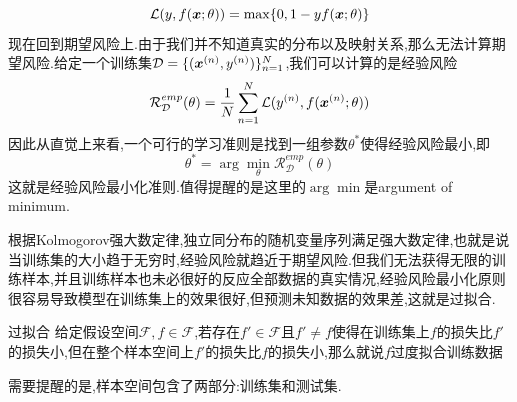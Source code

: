 $$
\mathcal{L}(y,f(\bm{x};\theta))=\max\{0,1-yf(\bm{x};\theta)\}
$$
\qquad 现在回到期望风险上.由于我们并不知道真实的分布以及映射关系,那么无法计算期望风险.给定一个训练集$\mathcal{D}=\{(\bm{x}^{(n)},y^{(n)})\}_{n=1}^N$,我们可以计算的是经验风险
$$
\mathcal{R}^{emp}_{\mathcal{D}}(\theta)=\frac{1}{N}\sum_{n=1}^N\mathcal{L}(y^{(n)},f(\bm{x}^{(n)};\theta))
$$
\qquad 因此从直觉上来看,一个可行的学习准则是找到一组参数$\theta^*$使得经验风险最小,即
$$
\theta^*=\arg\min_{\theta}\mathcal{R}^{emp}_{\mathcal{D}}(\theta)
$$
这就是经验风险最小化准则.值得提醒的是这里的$\arg\min$是argument of minimum.\par
根据Kolmogorov强大数定律,独立同分布的随机变量序列满足强大数定律,也就是说当训练集的大小趋于无穷时,经验风险就趋近于期望风险.但我们无法获得无限的训练样本,并且训练样本也未必很好的反应全部数据的真实情况,经验风险最小化原则很容易导致模型在训练集上的效果很好,但预测未知数据的效果差,这就是过拟合.
\begin{Definition}{过拟合}
    给定假设空间$\mathcal{F},f\in \mathcal{F}$,若存在$f'\in \mathcal{F}$且$f'\neq f$使得在训练集上$f$的损失比$f'$的损失小,但在整个样本空间上$f'$的损失比$f$的损失小,那么就说$f$过度拟合训练数据
\end{Definition}
需要提醒的是,样本空间包含了两部分:训练集和测试集.\par
